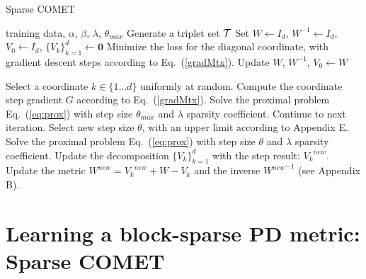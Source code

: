 \documentclass[twoside,11pt]{article}
\newcommand\mat[1]{{#1}}
\renewcommand\vec[1]{\mathbf{#1}}
\newcommand{\W}{\mat{W}}
\newcommand{\newW}{{\mat{W^{new}}}}
\newcommand{\ignore}[1]{}
\newcommand{\Vk}{\mat{V_k}}
\newcommand{\Vz}{\mat{V_0}}
\newcommand{\Vgrc}{\{\Vk\}_{k=1}^{d}} %
\newcommand{\cholL}{\mat{L}}
\renewcommand{\eqref}[1]{Eq.~(\ref{#1})}
\begin{document}
\begin{algorithm}[t]
   \caption{Sparse COMET}
   \label{alg:spcomet}
\begin{algorithmic}[1]
    training data, $\alpha$, $\beta$, $\lambda$, $\theta_{max}$
   \STATE Generate a triplet set $\cal{T}$
   \STATE Set  $\W  \leftarrow I_d$, $\W^{-1}  \leftarrow I_d$, $\Vz   \leftarrow I_d$, $\Vgrc \leftarrow \vec{0}$
   \STATE Minimize the loss for the diagonal coordinate, with gradient descent steps according to  \eqref{gradMtx}.
   \STATE Update $\W$, $\W^{-1}$, $\Vz \leftarrow \W$
    
   \REPEAT 
   \STATE Select a coordinate $k \in \{1 \ldots d\}$ uniformly at random.
   \STATE Compute the coordinate step gradient $\mat{G}$ according to \eqref{gradMtx}.
   \STATE Solve the proximal problem \eqref{eq:prox} with step size $\theta_{max}$ and $\lambda$ sparsity coefficient.
     \STATE Continue to next iteration.
   \ELSE 
      \STATE Select new step size $\theta$, with an upper limit according to Appendix E.
       \STATE Solve the proximal problem \eqref{eq:prox} with step size $\theta$ and $\lambda$ sparsity coefficient.
      \STATE Update the decomposition $\Vgrc$ with the step result: $\Vk^{new}$.
      \STATE Update the metric $\newW = \Vk^{new} + \W - \Vk$ and the inverse $\newW^{-1}$ (see Appendix B).
    \ENDIF
\end{algorithmic}
\vskip -5pt
\end{algorithm}

\vspace{-6pt}
\section{Learning a block-sparse PD metric: Sparse COMET}\vskip -5pt
\ignore{The PD metric learned above can be used for extracting new features, but one is often interested to maintain interpretability with \emph{feature selection}: learn a metric which only relies on a small subset of the original feature set, or a small subset of feature pairs. To that end, we develop a method for learning feature-sparse PD metrics, using a block-coordinate descent method that maintains the PD property during training.}
\end{document}
